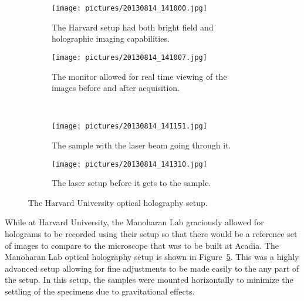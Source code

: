 \begin{figure}[ht!]
    \begin{center}

        \begin{subfigure}[t]{0.4\textwidth}
            \label{fig:second}
            \texttt{[image: pictures/20130814\_141000.jpg]}
            \caption{The Harvard setup had both bright field and holographic
            imaging capabilities.}
        \end{subfigure}
                \hspace*{\fill}
        \begin{subfigure}[t]{0.4\textwidth}
            \label{fig:third}
            \texttt{[image: pictures/20130814\_141007.jpg]}
            \caption{The monitor allowed for real time viewing of the images
            before and after acquisition.}
        \end{subfigure}
        \\

        \begin{subfigure}[t]{0.4\textwidth}
            \label{fig:fourth}
            \texttt{[image: pictures/20130814\_141151.jpg]}
            \caption{The sample with the laser beam going through it.}
        \end{subfigure}
        \hspace*{\fill}
        \begin{subfigure}[t]{0.4\textwidth}%
            \label{fig:fifth}
            \texttt{[image: pictures/20130814\_141310.jpg]}
            \caption{The laser setup before it gets to the sample.}
        \end{subfigure}

    \end{center}
    \caption{%
        The Harvard University optical holography setup.
    }%
    \label{fig:harvardSetup}
\end{figure}

While at
Harvard University, the Manoharan Lab graciously allowed for holograms to be
recorded using their setup so that there would be a reference set of images to
compare to the microscope
that was to be built at Acadia. The Manoharan Lab optical holography setup is shown in
Figure~\ref{fig:harvardSetup}. This was a highly advanced setup allowing for
fine adjustments to be made easily to the any part of the setup. In this setup,
the samples were mounted horizontally to minimize the settling of the specimens
due to gravitational effects.

